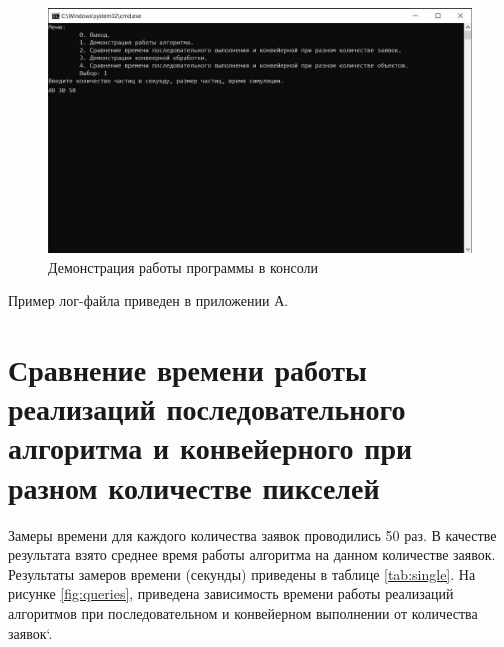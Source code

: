 \begin{figure}[H]
	\centering
	\includegraphics[width=1\linewidth]{inc/img/democonsole}
	\caption{Демонстрация работы программы в консоли}
	\label{fig:democonsole}
\end{figure}

Пример лог-файла приведен в приложении А.

\section{Сравнение времени работы реализаций последовательного алгоритма и конвейерного при разном количестве пикселей}

Замеры времени для каждого количества заявок проводились 50 раз. 
В качестве результата взято среднее время работы алгоритма на данном количестве заявок.
Результаты замеров времени (секунды) приведены в таблице \ref{tab:single}.
На рисунке \ref{fig:queries}, приведена зависимость времени работы реализаций алгоритмов при последовательном и конвейерном выполнении от количества заявок`. 

